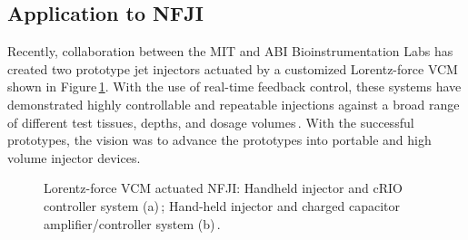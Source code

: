     
    \subsection{Application to \acs{NFJI}}          \label{Chapter:background/voice coil motors for NFJI/application}
    
    
    Recently, collaboration between the \ac{MIT} and \ac{ABI} Bioinstrumentation Labs has created two prototype jet injectors actuated by a customized Lorentz-force \ac{VCM}\,\cite{taberner2006,ruddy2014} shown in Figure\,\ref{fig:chapter/background/vcm injectors}. With the use of real-time feedback control, these systems have demonstrated highly controllable and repeatable injections against a broad range of different test tissues, depths, and dosage volumes\,\cite{taberner2012}. With the successful prototypes, the vision was to advance the prototypes into portable and high volume injector devices.


    \begin{figure}[!ht]
        \centering
        \qquad
        \caption[LoF entry]{
            Lorentz-force \acs{VCM} actuated \ac{NFJI}: Handheld injector and cRIO controller system (a)\,\cite{taberner2006}; Hand-held injector and charged capacitor amplifier/controller system (b)\,\cite{ruddy2014}.
        }   \label{fig:chapter/background/vcm injectors}
    \end{figure}
    
